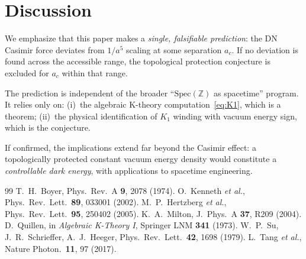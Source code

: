 \documentclass[aps,prl,twocolumn,superscriptaddress,nofootinbib]{revtex4-2}
\newcommand{\Spec}{\mathrm{Spec}}
\begin{document}
\section{Discussion}

We emphasize that this paper makes a \emph{single, falsifiable
prediction}: the DN Casimir force deviates from $1/a^5$ scaling
at some separation $a_c$.  If no deviation is found across the
accessible range, the topological protection conjecture is
excluded for $a_c$ within that range.

The prediction is independent of the broader ``$\Spec(\mathbb{Z})$
as spacetime'' program.  It relies only on:
(i)~the algebraic K-theory computation~\eqref{eq:K1}, which is a
theorem;
(ii)~the physical identification of $K_1$ winding with vacuum
energy sign, which is the conjecture.

If confirmed, the implications extend far beyond the Casimir
effect: a topologically protected constant vacuum energy density
would constitute a \emph{controllable dark energy}, with
applications to spacetime engineering.

\begin{thebibliography}{99}
 T.~H.~Boyer, Phys.\ Rev.\ A \textbf{9}, 2078 (1974).
 O.~Kenneth \textit{et al.}, Phys.\ Rev.\ Lett.\ \textbf{89}, 033001 (2002).
 M.~P.~Hertzberg \textit{et al.}, Phys.\ Rev.\ Lett.\ \textbf{95}, 250402 (2005).
 K.~A.~Milton, J.\ Phys.\ A \textbf{37}, R209 (2004).
 D.~Quillen, in \textit{Algebraic K-Theory I}, Springer LNM \textbf{341} (1973).
 W.~P.~Su, J.~R.~Schrieffer, A.~J.~Heeger, Phys.\ Rev.\ Lett.\ \textbf{42}, 1698 (1979).
 L.~Tang \textit{et al.}, Nature Photon.\ \textbf{11}, 97 (2017).
\end{thebibliography}
\end{document}
